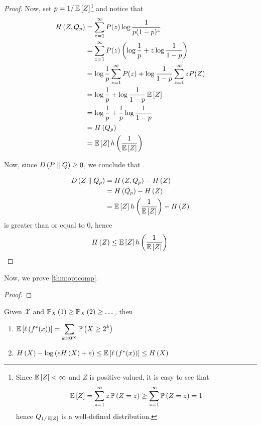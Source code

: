 \begin{proof}
    Now, set $p = \sfrac{1}{\expectation{Z}}$\footnote{
        Since $\expectation{Z} < \infty$ and $Z$ is positive-valued, it is easy to see that
        \[\expectation{Z} = \sum_{z = 1}^{\infty}z\prob{Z = z} \geq \sum_{z = 1}^{\infty}\prob{Z = z} = 1\]
        hence $Q_{\sfrac{1}{\expectation{Z}}}$ is a well-defined distribution.} and
    notice that
    \begin{align*}\entropy{Z, Q_p}
         & = \sum_{z=1}^{\infty}P(z)\log\frac{1}{p(1-p)^z}                                            \\
         & = \sum_{z=1}^{\infty}P(z)\left(\log\frac{1}{p} + z\log\frac{1}{1 - p}\right)               \\
         & = \log\frac{1}{p}\sum_{z = 1}^{\infty}P(z) + \log\frac{1}{1 - p}\sum_{z = 1}^{\infty}zP(Z) \\
         & = \log\frac{1}{p} + \log\frac{1}{1 - p}\expectation{Z}                                     \\
         & = \log\frac{1}{p} + \frac{1}{p}\log\frac{1}{1 - p}                                         \\
         & = \entropy{Q_p}                                                                            \\
         & = \expectation{Z}\binentropy{\frac{1}{\expectation{Z}}}
    \end{align*}

    Now, since $D\left(P \parallel Q\right) \geq 0$, we conclude that

    \begin{align*}\relentropy{Z}{Q_p}
         & = \entropy{Z, Q_p} - \entropy{Z}                                      \\
         & = \entropy{Q_p} - \entropy{Z}                                         \\
         & = \expectation{Z}\binentropy{\frac{1}{\expectation{Z}}} - \entropy{Z}
    \end{align*}
    is greater than or equal to 0, hence
    \[\entropy{Z} \leq \expectation{Z}\binentropy{\frac{1}{\expectation{Z}}}\qedhere\]
\end{proof}

Now, we prove \cref{thm:optcomp}.

\begin{proof}

\end{proof}

\begin{theorem}
    Given $\mathcal{X}$ and $\prob[X]{1} \geq \prob[X]{2} \geq \dots$, then
    \begin{enumerate}[label=(\arabic*)]
        \item \label{item:optlengthpow2}$\expectation{\length{f^*(x)}} = \displaystyle\sum_{k=0^{\infty}}\prob{X \geq 2^k}$
        \item $\entropy{X} - \log\left(e\entropy{X} + e\right) \leq \expectation{\length{f^*(x)}} \leq \entropy{X}$
    \end{enumerate}
\end{theorem}

